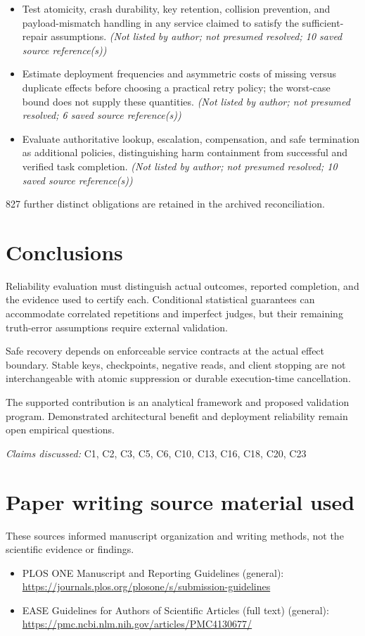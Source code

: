 \documentclass[11pt]{article}
\begin{document}
\begin{itemize}
\item Test atomicity, crash durability, key retention, collision prevention, and payload-mismatch handling in any service claimed to satisfy the sufficient-repair assumptions. \textit{ (Not listed by author; not presumed resolved; 10 saved source reference(s))}
\item Estimate deployment frequencies and asymmetric costs of missing versus duplicate effects before choosing a practical retry policy; the worst-case bound does not supply these quantities. \textit{ (Not listed by author; not presumed resolved; 6 saved source reference(s))}
\item Evaluate authoritative lookup, escalation, compensation, and safe termination as additional policies, distinguishing harm containment from successful and verified task completion. \textit{ (Not listed by author; not presumed resolved; 10 saved source reference(s))}
\end{itemize}
827 further distinct obligations are retained in the archived reconciliation.
\section{Conclusions}
Reliability evaluation must distinguish actual outcomes, reported completion, and the evidence used to certify each. Conditional statistical guarantees can accommodate correlated repetitions and imperfect judges, but their remaining truth-error assumptions require external validation.

Safe recovery depends on enforceable service contracts at the actual effect boundary. Stable keys, checkpoints, negative reads, and client stopping are not interchangeable with atomic suppression or durable execution-time cancellation.

The supported contribution is an analytical framework and proposed validation program. Demonstrated architectural benefit and deployment reliability remain open empirical questions.

\textit{Claims discussed: }C1, C2, C3, C5, C6, C10, C13, C16, C18, C20, C23
\section*{Paper writing source material used}
These sources informed manuscript organization and writing methods, not the scientific evidence or findings.
\begin{itemize}
\item PLOS ONE \textemdash{} Manuscript and Reporting Guidelines (general): \url{https://journals.plos.org/plosone/s/submission-guidelines}
\item EASE \textemdash{} Guidelines for Authors of Scientific Articles (full text) (general): \url{https://pmc.ncbi.nlm.nih.gov/articles/PMC4130677/}
\end{itemize}
\end{document}
